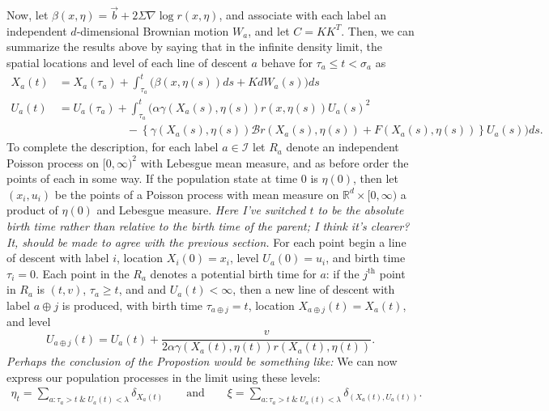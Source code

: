 \documentclass[12pt]{article}
\newcommand{\IR}{\mathbb R}
\newcommand{\grad}{\nabla}
\newcommand{\DG}{\mathcal{B}}  %
\newcommand{\meanq}{\vec b}    %
\newcommand{\covq}{C}     %
\newcommand{\lp}{\xi}              %
\newcommand{\labelspace}{\mathcal{I}} %
\newcommand{\concat}{\oplus}   %
\newcommand{\comment}[1]{{\color{blue} \it #1}}
\begin{document}
Now, let $\beta(x, \eta) = \meanq + 2 \Sigma \grad \log r(x, \eta)$,
and associate with each label an independent $d$-dimensional Brownian motion $W_a$,
and let $\covq = K K^T$.
Then, we can summarize the results above by saying that
in the infinite density limit,
the spatial locations and level of each line of descent $a$
behave for $\tau_a \le t < \sigma_a$ as
\begin{align*}
X_a(t)
    &=
    X_a(\tau_a)
    + \int_{\tau_a}^{t}
    \bigg(
        \beta(x, \eta(s)) ds
        +
        K dW_a(s)
    \bigg)
    ds  \\
U_a(t)
    &=
    U_a(\tau_a)
    + \int_{\tau_a}^{t}
    \bigg(
        \alpha \gamma(X_a(s),\eta(s))
        r(x,\eta(s)) U_a(s)^2
\\ &\qquad \qquad \qquad {}   
        -
        \left\{
            \gamma(X_a(s),\eta(s)) \DG r(X_a(s),\eta(s))
            + F(X_a(s), \eta(s))
        \right\}
        U_a(s)
    \bigg)
    ds .
\end{align*}
To complete the description,
for each label $a \in \labelspace$ let $R_a$ denote an independent Poisson process on $[0, \infty)^2$
with Lebesgue mean measure,
and as before order the points of each in some way.
If the population state at time 0 is $\eta(0)$,
then let $(x_i, u_i)$ be the points of a Poisson process
with mean measure on $\IR^d \times [0, \infty)$ a product of $\eta(0)$ and Lebesgue measure.
\comment{Here I've switched $t$ to be the absolute birth time
rather than relative to the birth time of the parent; I think it's clearer?
It, should be made to agree with the previous section.}
For each point begin a line of descent
with label $i$, location $X_i(0) = x_i$, level $U_a(0) = u_i$, and birth time $\tau_i = 0$.
Each point in the $R_a$ denotes a potential birth time for $a$:
if the $j^\text{th}$ point in $R_a$ is $(t, v)$,
$\tau_a \ge t$, and and $U_a(t) < \infty$,
then a new line of descent with label $a \concat j$ is produced,
with birth time $\tau_{a \concat j} = t$, location $X_{a \concat j}(t) = X_a(t)$, and level
$$
    U_{a \concat j}(t) = U_a(t)
    + \frac{v}{ 2 \alpha \gamma(X_a(t), \eta(t)) r(X_a(t), \eta(t)) } .
$$
\comment{Perhaps the conclusion of the Propostion would be something like:}
We can now express our population processes in the limit using these levels:
\begin{align*}
    \eta_t = \sum_{a : \tau_a > t \;\&\; U_a(t) < \lambda} \delta_{X_a(t)}
    \qquad \text{and} \qquad
    \lp = \sum_{a : \tau_a > t \;\&\; U_a(t) < \lambda} \delta_{(X_a(t), U_a(t))} .
\end{align*}
\end{document}
